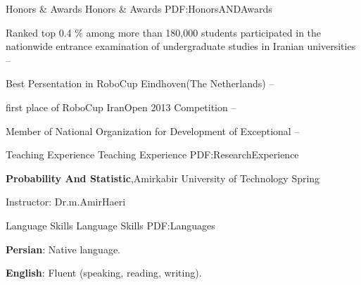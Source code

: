 \documentclass[letterpaper,MMMyyyy,nonstopmode]{simpleresumecv}
\begin{document}
\begin{Body}




\Gap




\Section
{Honors \&\newline
Awards}
{Honors \& Awards}
{PDF:HonorsANDAwards}

\BulletItem
Ranked top 0.4 \% among more than 180,000 students participated
in the nationwide entrance examination of undergraduate studies
in Iranian universities  
\hfill
{} --

\BulletItem
Best Persentation in RoboCup Eindhoven(The Netherlands) 
\hfill
{} --

\BulletItem
 first place of RoboCup IranOpen 2013 Competition
\hfill
{} --

\BulletItem
 Member of National Organization for Development of Exceptional 
\hfill
{} --



\Section
{Teaching Experience}
{Teaching Experience}
{PDF:ResearchExperience}

\Entry
\textbf{Probability And Statistic},Amirkabir University of Technology
\hfill
Spring 

\BulletItem
Instructor: Dr.m.AmirHaeri








\Section
{Language Skills}
{Language Skills}
{PDF:Languages}

\BulletItem
\textbf{Persian}: Native language.

\Gap
\BulletItem
\textbf {English}: Fluent (speaking, reading, writing).


\end{Body}
\end{document}
